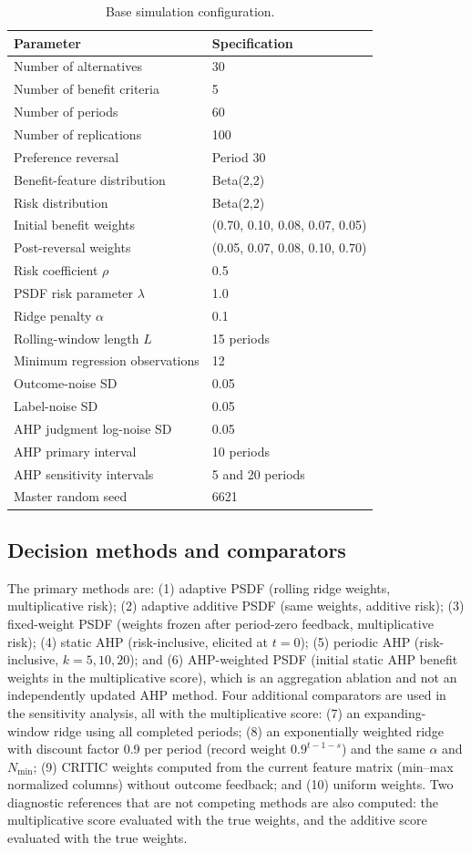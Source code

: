 \documentclass[12pt,a4paper]{article}
\begin{document}
\begin{table}[t]
\centering\small
\caption{Base simulation configuration.}\label{tab:config}
\begin{tabular}{ll}
\toprule
Parameter & Specification\\
\midrule
Number of alternatives & 30\\
Number of benefit criteria & 5\\
Number of periods & 60\\
Number of replications & 100\\
Preference reversal & Period 30\\
Benefit-feature distribution & Beta(2,2)\\
Risk distribution & Beta(2,2)\\
Initial benefit weights & (0.70, 0.10, 0.08, 0.07, 0.05)\\
Post-reversal weights & (0.05, 0.07, 0.08, 0.10, 0.70)\\
Risk coefficient $\rho$ & 0.5\\
PSDF risk parameter $\lambda$ & 1.0\\
Ridge penalty $\alpha$ & 0.1\\
Rolling-window length $L$ & 15 periods\\
Minimum regression observations & 12\\
Outcome-noise SD & 0.05\\
Label-noise SD & 0.05\\
AHP judgment log-noise SD & 0.05\\
AHP primary interval & 10 periods\\
AHP sensitivity intervals & 5 and 20 periods\\
Master random seed & 6621\\
\bottomrule
\end{tabular}
\end{table}

\subsection{Decision methods and comparators}
The primary methods are: (1) adaptive PSDF (rolling ridge weights, multiplicative risk); (2) adaptive additive PSDF (same weights, additive risk); (3) fixed-weight PSDF (weights frozen after period-zero feedback, multiplicative risk); (4) static AHP (risk-inclusive, elicited at $t=0$); (5) periodic AHP (risk-inclusive, $k=5,10,20$); and (6) AHP-weighted PSDF (initial static AHP benefit weights in the multiplicative score), which is an aggregation ablation and not an independently updated AHP method. Four additional comparators are used in the sensitivity analysis, all with the multiplicative score: (7) an expanding-window ridge using all completed periods; (8) an exponentially weighted ridge with discount factor 0.9 per period (record weight $0.9^{t-1-s}$) and the same $\alpha$ and $N_{\min}$; (9) CRITIC weights computed from the current feature matrix (min--max normalized columns) without outcome feedback; and (10) uniform weights. Two diagnostic references that are not competing methods are also computed: the multiplicative score evaluated with the true weights, and the additive score evaluated with the true weights.
\end{document}

